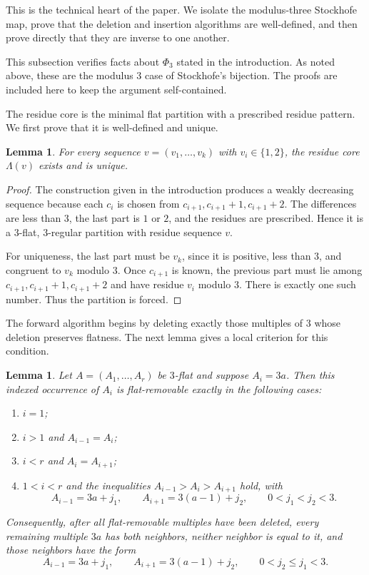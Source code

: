 \documentclass[11pt]{amsart}
\newtheorem{lemma}[theorem]{Lemma}
\theoremstyle{definition}
\theoremstyle{remark}
\begin{document}
This is the technical heart of the paper.  We isolate the modulus-three Stockhofe map, prove that the deletion and insertion algorithms are well-defined, and then prove directly that they are inverse to one another.

This subsection verifies facts about $\Phi_3$ stated in the introduction.  As
noted above, these are the modulus $3$ case of Stockhofe's bijection.  The proofs
are included here to keep the argument self-contained.

The residue core is the minimal flat partition with a prescribed residue pattern.  We first prove that it is well-defined and unique.

\begin{lemma}\label{lem:core}
For every sequence $v=(v_1,\ldots,v_k)$ with $v_i\in\{1,2\}$, the residue core $\Lambda(v)$ exists and is unique.
\end{lemma}

\begin{proof}
The construction given in the introduction produces a weakly decreasing sequence because each $c_i$ is chosen from $c_{i+1},c_{i+1}+1,c_{i+1}+2$.  The differences are less than $3$, the last part is $1$ or $2$, and the residues are prescribed.  Hence it is a $3$-flat, $3$-regular partition with residue sequence $v$.

For uniqueness, the last part must be $v_k$, since it is positive, less than $3$, and congruent to $v_k$ modulo $3$.  Once $c_{i+1}$ is known, the previous part must lie among $c_{i+1},c_{i+1}+1,c_{i+1}+2$ and have residue $v_i$ modulo $3$.  There is exactly one such number.  Thus the partition is forced.
\end{proof}

The forward algorithm begins by deleting exactly those multiples of $3$ whose deletion preserves flatness.  The next lemma gives a local criterion for this condition.

\begin{lemma}\label{lem:removable}
Let $A=(A_1,\ldots,A_r)$ be $3$-flat and suppose $A_i=3a$.  Then this
indexed occurrence of $A_i$ is flat-removable exactly in the following cases:
\begin{enumerate}[label=(\roman*),leftmargin=2.6em]
\item $i=1$;
\item $i>1$ and $A_{i-1}=A_i$;
\item $i<r$ and $A_i=A_{i+1}$;
\item $1<i<r$ and the inequalities $A_{i-1}>A_i>A_{i+1}$ hold, with
\[
        A_{i-1}=3a+j_1,
        \qquad
        A_{i+1}=3(a-1)+j_2,
        \qquad
        0<j_1<j_2<3.
\]
\end{enumerate}
Consequently, after all flat-removable multiples have been deleted, every
remaining multiple $3a$ has both neighbors, neither neighbor is equal to it, and
those neighbors have the form
\[
        A_{i-1}=3a+j_1,
        \qquad
        A_{i+1}=3(a-1)+j_2,
        \qquad
        0<j_2\le j_1<3.
\]
\end{lemma}
\end{document}
